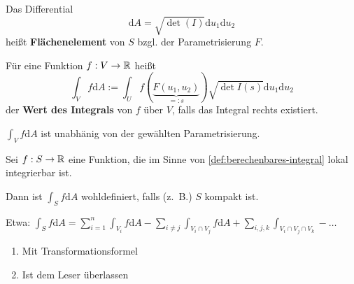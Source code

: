 \begin{definition}%
    \begin{defenum}
        \item Das Differential
              \[\mathrm{d} A = \sqrt{\det (I)} \mathrm{d} u_1 \mathrm{d} u_2\]
              heißt \textbf{Flächenelement} von $S$ bzgl. der Parametrisierung $F$.
        \item \label{def:berechenbares-integral}Für eine Funktion $f: V \rightarrow \mathbb{R}$ heißt 
              \[\int_V f \mathrm{d} A := \int_U f(\underbrace{F(u_1, u_2)}_{=: s}) \sqrt{\det I(s)} \mathrm{d} u_1 \mathrm{d} u_2\]
              der \textbf{Wert des Integrals} von $f$ über $V$, falls das Integral rechts
              existiert.
    \end{defenum}

\end{definition}

\begin{bemerkung}
    \begin{bemenum}
        \item $\int_V f \mathrm{d} A$ ist unabhänig von der gewählten Parametrisierung.
        \item Sei $f: S \rightarrow \mathbb{R}$ eine Funktion, die im Sinne von
              \cref{def:berechenbares-integral} lokal integrierbar ist.

              Dann ist $\int_S f \mathrm{d} A$ wohldefiniert, falls (z.~B.) $S$
              kompakt ist.

              Etwa: $\int_S f \mathrm{d} A = \sum_{i=1}^n \int_{V_i} f \mathrm{d} A - \sum_{i \neq j} \int_{V_i \cap V_j} f \mathrm{d} A + \sum_{i,j,k} \int_{V_i \cap V_j \cap V_k} - \dots$
    \end{bemenum}
\end{bemerkung}

\begin{beweis}
    \begin{enumerate}[label=\alph*)]
        \item Mit Transformationsformel
        \item Ist dem Leser überlassen
    \end{enumerate}
\end{beweis}


